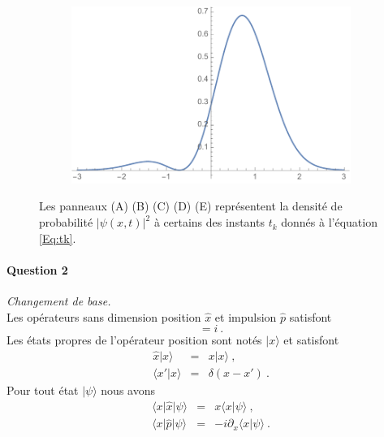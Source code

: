 \begin{enumerate}
\begin{figure}
    \vspace{1cm}
   \begin{subfigure}[t]{0.4\textwidth}
    \hfill       
        \centering
        \includegraphics[width=\linewidth]{Pictures/FigPsi0.pdf}
        \caption{} \label{fig:timingE}
    \end{subfigure}
 
        
    \caption{Les panneaux (A) (B) (C) (D) (E) représentent la densité de probabilité 
$ \vert \psi(x,t)\vert^2$ à certains des instants $t_k$ donnés à l'équation \eqref{Eq:tk}.}
\label{FigPsi2}
\end{figure}





\end{enumerate}

\paragraph{Question 2} \textit{Changement de base.} \\

Les opérateurs sans dimension position $\hat x$ et impulsion $\hat p$ satisfont 
\begin{equation}
[\hat x, \hat p ] = i\ .
\label{xp:1}
\end{equation}
Les états propres de l'opérateur position sont notés $\vert x \rangle$ et satisfont
\begin{eqnarray}
\hat x \vert x \rangle &=& x\vert x \rangle \ ,\label{xp:2B}\\
\langle x' \vert x \rangle &=& \delta (x-x') \ .
\label{xp:2}
\end{eqnarray}
Pour tout état $\vert \psi \rangle$ nous avons
\begin{eqnarray}
\langle x \vert \hat x \vert \psi \rangle &=& x  \langle x  \vert \psi \rangle \ ,
\label{xp:3}\\
\langle x \vert \hat p \vert \psi \rangle &=& -i \partial_x  \langle x  \vert \psi\rangle\ . \label{xp:4}
\end{eqnarray}

